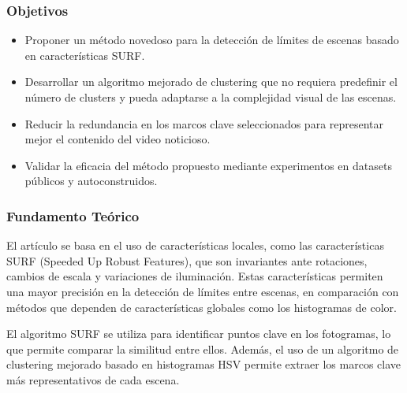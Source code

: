 \subsubsection{Objetivos}
\begin{itemize}
	\item Proponer un método novedoso para la detección de límites de escenas basado en características SURF.
	\item Desarrollar un algoritmo mejorado de clustering que no requiera predefinir el número de clusters y pueda adaptarse a la complejidad visual de las escenas.
	\item Reducir la redundancia en los marcos clave seleccionados para representar mejor el contenido del video noticioso.
	\item Validar la eficacia del método propuesto mediante experimentos en datasets públicos y autoconstruidos.
\end{itemize}
\subsubsection{Fundamento Teórico}
El artículo se basa en el uso de características locales, como las características SURF (Speeded Up Robust Features), que son invariantes ante rotaciones, cambios de escala y variaciones de iluminación. Estas características permiten una mayor precisión en la detección de límites entre escenas, en comparación con métodos que dependen de características globales como los histogramas de color. 

El algoritmo SURF se utiliza para identificar puntos clave en los fotogramas, lo que permite comparar la similitud entre ellos. Además, el uso de un algoritmo de clustering mejorado basado en histogramas HSV permite extraer los marcos clave más representativos de cada escena.
